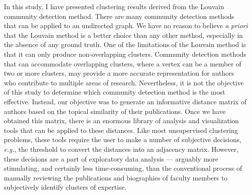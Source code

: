 \documentclass[12pt]{article}
\begin{document}


In this study, I have presented clustering results derived from the Louvain community detection method.
There are many community detection methods that can be applied to an undirected graph.
We have no reason to believe \textit{a priori} that the Louvain method is a better choice than any other method, especially in the absence of any ground truth.
One of the limitations of the Louvain method is that it can only produce non-overlapping clusters.
Community detection methods that can accommodate overlapping clusters, where a vertex can be a member of two or more clusters, may provide a more accurate representation for authors who contribute to multiple areas of research.
Nevertheless, it is not the objective of this study to determine which community detection method is the most effective.
Instead, our objective was to generate an informative distance matrix of authors based on the topical similarity of their publications.
Once we have obtained this matrix, there is an enormous library of analysis and visualization tools that can be applied to these distances.
Like most unsupervised clustering problems, these tools require the user to make a number of subjective decisions, \textit{e.g.}, the threshold to convert the distances into an adjacency matrix.
However, these decisions are a part of exploratory data analysis --- arguably more stimulating, and certainly less time-consuming, than the conventional process of manually reviewing the publications and biographies of faculty members to subjectively identify clusters of expertise.





\end{document}
